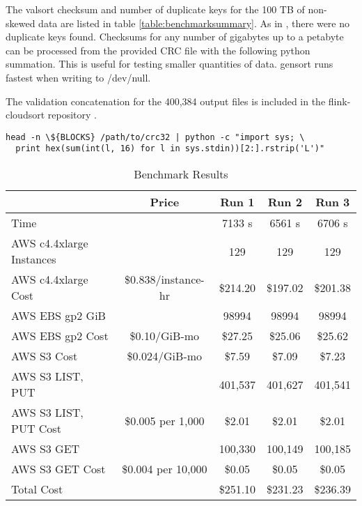 \documentclass{article}
\begin{document}
The valsort checksum and number of duplicate keys for the 100 TB of non-skewed data are listed in table \ref{table:benchmarksummary}. As in \cite{tritonsort2014}, there were no duplicate keys found. Checksums for any number of gigabytes up to a petabyte can be processed from the provided CRC file \cite{flink-cloudsort} with the following python summation. This is useful for testing smaller quantities of data. gensort \cite{gensort} runs fastest when writing to /dev/null.

The validation concatenation for the 400,384 output files is included in the flink-cloudsort repository \cite{flink-cloudsort}.

\begin{verbatim}
head -n \${BLOCKS} /path/to/crc32 | python -c "import sys; \
  print hex(sum(int(l, 16) for l in sys.stdin))[2:].rstrip('L')"
\end{verbatim}

\begin{table}
  \begin{adjustwidth}{-1.5in}{-1.5in}  
    \centering
    \begin{tabular}{ | l | c | c | c | c | }
      \hline
      & Price & Run 1 & Run 2 & Run 3 \\
      \hline
      Time & & 7133 s & 6561 s & 6706 s \\
      \hline
      AWS c4.4xlarge Instances & & 129 & 129 & 129 \\
      AWS c4.4xlarge Cost & \$0.838/instance-hr & \$214.20 & \$197.02 & \$201.38 \\
      \hline
      AWS EBS gp2 GiB & & 98994 & 98994 & 98994 \\
      AWS EBS gp2 Cost & \$0.10/GiB-mo & \$27.25 & \$25.06 & \$25.62 \\
      \hline
      AWS S3 Cost & \$0.024/GiB-mo & \$7.59 & \$7.09 & \$7.23 \\
      \hline
      AWS S3 LIST, PUT & & 401,537 & 401,627 & 401,541 \\
      AWS S3 LIST, PUT Cost & \$0.005 per 1,000 & \$2.01 & \$2.01 & \$2.01 \\
      \hline
      AWS S3 GET & & 100,330 & 100,149 & 100,185 \\
      AWS S3 GET Cost & \$0.004 per 10,000 & \$0.05 & \$0.05 & \$0.05 \\
      \hline
      Total Cost & & \$251.10 & \$231.23 & \$236.39 \\
      \hline
    \end{tabular}
    \caption{Benchmark Results}
    \label{table:benchmarkresults}
  \end{adjustwidth}
\end{table}
\end{document}
